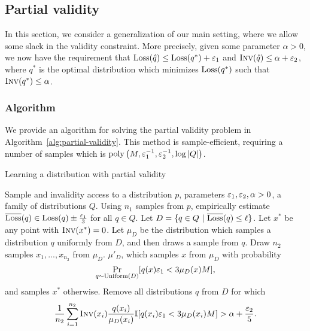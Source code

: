 \subsection{Partial validity}
\label{sec:partial-validity}
In this section, we consider a generalization of our main setting, where we allow some slack in the validity constraint.
More precisely, given some parameter $\alpha > 0$, we now have the requirement that $\text{Loss}(\hat q) \leq \text{Loss}(q^*) + \varepsilon_1$ and $\textsc{Inv}(\hat q) \leq \alpha + \varepsilon_2$, where $q^*$ is the optimal distribution which minimizes $\text{Loss}(q^*)$ such that $\textsc{Inv}(q^*) \leq \alpha$.


\subsubsection{Algorithm}
We provide an algorithm for solving the partial validity problem in Algorithm~\ref{alg:partial-validity}.
This method is sample-efficient, requiring a number of samples which is $\operatorname*{poly}\left(M, \varepsilon_1^{-1}, \varepsilon_2^{-1}, \log |Q|\right)$.

\begin{algorithm}[ht]
   \caption{Learning a distribution with partial validity}
   \label{alg:partial-validity}
\begin{algorithmic}[1]
    Sample and invalidity access to a distribution $p$, parameters $\varepsilon_1, \varepsilon_2, \alpha > 0$, a family of distributions $Q$.
   \STATE Using $n_1$  samples from $p$, empirically estimate $\overline {\text{Loss}}(q) \in \text{Loss}(q) \pm \frac {\varepsilon_1} 3$ for all $q \in Q.$
    \label{ln:partial-validity-outer-loop}
   \STATE Let $D = \{q \in Q\ |\ \overline {\text{Loss}}(q) \le \ell \}$.
   \STATE Let $x^*$ be any point with $\textsc{Inv}(x^*) = 0$.
   \STATE Let $\mu_D$ be the distribution which samples a distribution $q$ uniformly from $D$, and then draws a sample from $q$.
    \label{ln:partial-validity-inner-loop}
   \STATE Draw $n_2$ samples $x_1, ..., x_{n_2}$ from $\mu_D$.
   \RETURN $\mu'_D$, which samples $x$ from $\mu_D$ with probability $$\Pr_{q \sim \text{Uniform}(D)}[q(x) {\varepsilon_1} < 3 \mu_D(x) {M} ],$$ and samples $x^*$ otherwise.
   \ELSE \STATE Remove all distributions $q$ from $D$ for which $$\frac{1}{n_2} \sum_{i=1}^{n_2} \textsc{Inv}(x_i) \frac {q(x_i)} {\mu_D(x_i)} \mathbb{I}[q(x_i) {\varepsilon_1} < 3 \mu_D(x_i) {M} ] > \alpha + \frac {\varepsilon_2} {5}.$$  
   \ENDIF
   \ENDWHILE
   \ENDFOR
\end{algorithmic}
\end{algorithm}

